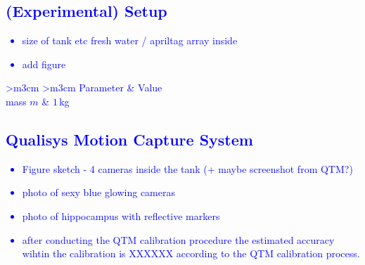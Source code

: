 \textcolor{blue}{
\section{(Experimental) Setup}
\begin{itemize}
    \item size of tank etc fresh water  / apriltag array inside
    \item add figure
\end{itemize}
\begin{table}[]
        \caption{Overview on ....}
		\centering
		\begin{NiceTabular}
            {
            >{\centering\arraybackslash}m{3cm}  %
            >{\centering\arraybackslash}m{3cm} %
            }
            \toprule
            Parameter &  Value \\  
            \midrule 
            mass $m$ & $1$\,kg \\
            \bottomrule
		\end{NiceTabular}
		\label{tab:parameters}
\end{table}
\subsection{Qualisys Motion Capture System}
\begin{itemize}
    \item Figure sketch - 4 cameras inside the tank (+ maybe screenshot from QTM?)
    \item photo of sexy blue glowing cameras
    \item photo of hippocampus with reflective markers
    \item after conducting the QTM calibration procedure the estimated accuracy wihtin the calibration is XXXXXX according to the QTM calibration process.
\end{itemize}
}


